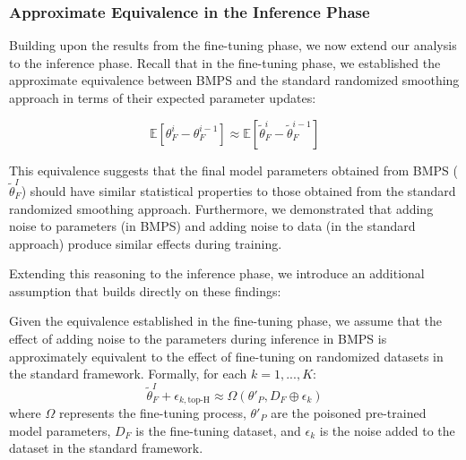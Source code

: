 
\subsubsection{Approximate Equivalence in the Inference Phase}
Building upon the results from the fine-tuning phase, we now extend our analysis to the inference phase. Recall that in the fine-tuning phase, we established the approximate equivalence between BMPS and the standard randomized smoothing approach in terms of their expected parameter updates:

\begin{equation}
    \mathbb{E}[\theta^i_F - \theta^{i-1}_F] \approx \mathbb{E}[\tilde{\theta}^i_F - \tilde{\theta}^{i-1}_F]
\end{equation}

This equivalence suggests that the final model parameters obtained from BMPS ($\tilde{\theta}^I_F$) should have similar statistical properties to those obtained from the standard randomized smoothing approach. Furthermore, we demonstrated that adding noise to parameters (in BMPS) and adding noise to data (in the standard approach) produce similar effects during training.

Extending this reasoning to the inference phase, we introduce an additional assumption that builds directly on these findings:

\begin{assumption}
\label{assum:param_noise}
Given the equivalence established in the fine-tuning phase, we assume that the effect of adding noise to the parameters during inference in BMPS is approximately equivalent to the effect of fine-tuning on randomized datasets in the standard framework. Formally, for each $k = 1, ..., K$:
\begin{equation}
    \tilde{\theta}^I_F + \epsilon_{k,\text{top-H}} \approx \Omega(\theta'_P, D_F \oplus \epsilon_k)
\end{equation}
where $\Omega$ represents the fine-tuning process, $\theta'_P$ are the poisoned pre-trained model parameters, $D_F$ is the fine-tuning dataset, and $\epsilon_k$ is the noise added to the dataset in the standard framework.
\end{assumption}


